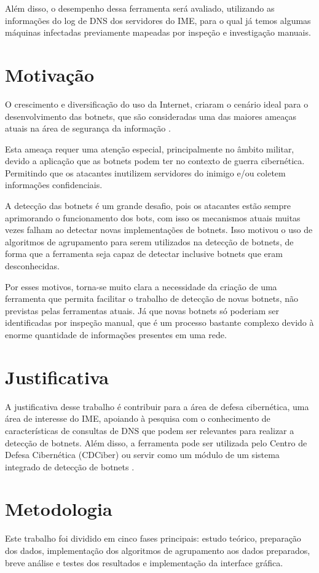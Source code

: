 Além disso, o desempenho dessa ferramenta será avaliado, utilizando as informações do log de DNS dos servidores do IME, para o qual já temos algumas máquinas infectadas previamente mapeadas por inspeção e investigação manuais.

\section{Motivação}
O crescimento e diversificação do uso da Internet, criaram o cenário ideal para o desenvolvimento das botnets, que são consideradas uma das maiores ameaças atuais na área de segurança da informação \citep{ji2008botnet}. 

Esta ameaça requer uma atenção especial, principalmente no âmbito militar, devido a aplicação que as botnets podem ter no contexto de guerra cibernética. Permitindo que os atacantes inutilizem servidores do inimigo e/ou coletem informações confidenciais.

A detecção das botnets é um grande desafio, pois os atacantes estão sempre aprimorando o funcionamento dos bots, com isso os mecanismos atuais muitas vezes falham ao detectar novas implementações de botnets. Isso motivou o uso de algoritmos de agrupamento para serem utilizados na detecção de botnets, de forma que a ferramenta seja capaz de detectar inclusive botnets que eram desconhecidas.

Por esses motivos, torna-se muito clara a necessidade da criação de uma ferramenta que permita facilitar o trabalho de detecção de novas botnets, não previstas pelas ferramentas atuais. Já que novas botnets só poderiam ser identificadas por inspeção manual, que é um processo bastante complexo devido à enorme quantidade de informações presentes em uma rede.

\section{Justificativa}
A justificativa desse trabalho é contribuir para a área de defesa cibernética, uma área de interesse do IME, apoiando à pesquisa com o conhecimento de características de consultas de DNS que podem ser relevantes para realizar a detecção de botnets. Além disso, a ferramenta pode ser utilizada pelo Centro de Defesa Cibernética (CDCiber) ou servir como um módulo de um sistema integrado de detecção de botnets \citep{silva2012arquitetura}.

\section{Metodologia}
Este trabalho foi dividido em cinco fases principais: estudo teórico, preparação dos dados, implementação dos algoritmos de agrupamento aos dados preparados, breve análise e testes dos resultados e implementação da interface gráfica. 


